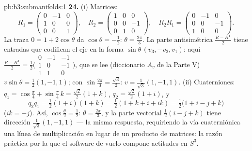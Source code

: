 \begin{solution}{pb:b3:submanifolds:1}
\textbf{24.} (i) Matrices:
\[
R_1 = \begin{pmatrix} 0 & -1 & 0\\ 1 & 0 & 0\\ 0 & 0 & 1
\end{pmatrix},
\quad
R_2 = \begin{pmatrix} 1 & 0 & 0\\ 0 & 0 & -1\\ 0 & 1 & 0
\end{pmatrix},
\quad
R_2R_1 = \begin{pmatrix} 0 & -1 & 0\\ 0 & 0 & -1\\ 1 & 0 &
0\end{pmatrix}.
\]
La traza $0 = 1 + 2\cos\theta$ da $\cos\theta = -\frac12$:
$\theta = \frac{2\pi}3$. La parte antisimétrica $\frac{R -
R^{\mathsf T}}2$ tiene entradas que codifican el eje en la forma
$\sin\theta\,(v_3,
-v_2, v_1)$: aquí $\frac{R - R^{\mathsf T}}2 =
\frac12\bigl(\begin{smallmatrix}0 & -1 & -1\\ 1 & 0 & -1\\ 1
& 1 & 0\end{smallmatrix}\bigr)$, que se lee (diccionario $A_v$ de la
Parte V) $v\sin\theta = \frac12(1, -1, 1)$; con
$\sin\frac{2\pi}3 = \frac{\sqrt3}2$: $v = \frac1{\sqrt3}(1,
-1, 1)$.
(ii) Cuaterniones: $q_1 = \cos\frac\pi4 + \sin\frac\pi4\,k =
\frac{\sqrt2}2(1 + k)$, $q_2 = \frac{\sqrt2}2(1 + i)$, y
\[
q_2q_1 = \tfrac12(1 + i)(1 + k) = \tfrac12(1 + k + i + ik)
= \tfrac12\bigl(1 + i - j + k\bigr)
\]
($ik = -j$). Así, $\cos\frac\theta2 = \frac12$: $\theta =
\frac{2\pi}3$, y la parte vectorial $\frac12(i - j + k)$ tiene dirección
$\frac1{\sqrt3}(1, -1, 1)$ --- la misma respuesta, requiriendo la vía
cuaterniónica una línea de multiplicación en lugar de un producto de
matrices: la razón práctica por la que el software de vuelo compone
actitudes en $S^3$.


\end{solution}
